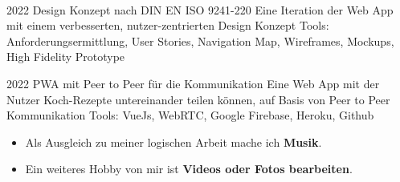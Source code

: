 \begin{paracol}{2}
    \begin{leftcolumn}
    
    
    \end{leftcolumn}
    
    \begin{rightcolumn}
    
     \\[14pt]
    \vspace{-12pt}
    
    \vfill\null
    \cvevent
        {2022}
        {Design Konzept nach DIN EN ISO 9241-220}
        {}
        {Eine Iteration der Web App mit einem verbesserten, nutzer-zentrierten Design Konzept}
        {Tools: Anforderungsermittlung, User Stories, Navigation Map, Wireframes, Mockups, High Fidelity Prototype}
    \vfill\null
    
    \cvevent
        {2022}
        {PWA mit Peer to Peer für die Kommunikation}
        {}
        {Eine Web App mit der Nutzer Koch-Rezepte untereinander teilen können, auf Basis von Peer to Peer Kommunikation}
        {Tools: VueJs, WebRTC, Google Firebase, Heroku, Github}
    \vfill\null
    
    \vfill\null
    \vspace{-0.3cm}
    \begin{itemize}
      \item Als Ausgleich zu meiner logischen Arbeit mache ich \textbf{Musik}.
      \item Ein weiteres Hobby von mir ist \textbf{Videos oder Fotos bearbeiten}.
    \end{itemize}
    \vfill\null
    
    \vfill
    \vfill
    \vfill
    \end{rightcolumn}
    \end{paracol}